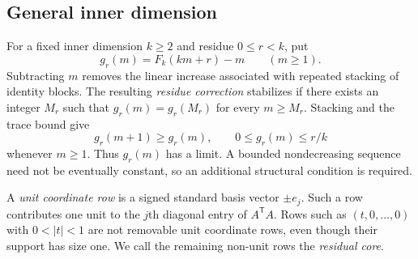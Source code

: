 \documentclass[11pt]{article}
\numberwithin{equation}{section}
\theoremstyle{definition}
\theoremstyle{definition}
\begin{document}
\subsection{General inner dimension}
For a fixed inner dimension $k\ge2$ and residue $0\le r<k$,
put
\[
 g_r(m)=F_k(km+r)-m\qquad(m\ge1).
\]
Subtracting $m$ removes the linear increase associated with
repeated stacking of identity blocks. The resulting \emph{residue
correction} stabilizes if there exists an integer $M_r$ such that
$g_r(m)=g_r(M_r)$ for every $m\ge M_r$.
Stacking and the trace bound give
\[
 g_r(m+1)\ge g_r(m),\qquad 0\le g_r(m)\le r/k
\]
whenever $m\ge1$. Thus $g_r(m)$ has a limit.  A bounded nondecreasing sequence need
not be eventually constant, so an additional structural condition is
required.

A \emph{unit coordinate row} is a signed standard basis vector
$\pm e_j$.  Such a row contributes one unit to the $j$th diagonal
entry of $A^{\mathsf T}A$.  Rows such as $(t,0,\ldots,0)$ with
$0<|t|<1$ are not removable unit coordinate rows, even though
their support has size one.  We call the remaining non-unit rows
the \emph{residual core}.
\end{document}
